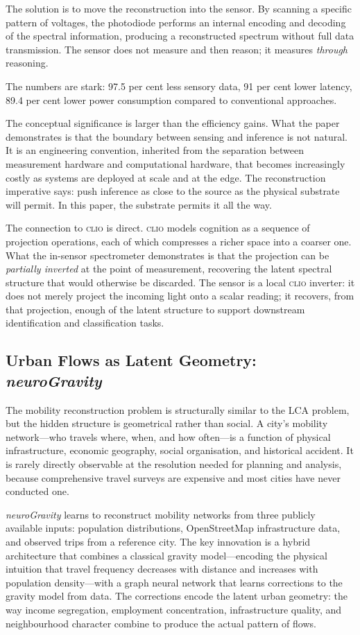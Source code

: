 \documentclass[12pt, letterpaper]{article}
\theoremstyle{remark}
\newcommand{\clio}{\textsc{clio}}
\newcommand{\neuro}{\textit{neuroGravity}}
\begin{document}
The solution is to move the reconstruction into the sensor.  By scanning
a specific pattern of voltages, the photodiode performs an internal
encoding and decoding of the spectral information, producing a reconstructed
spectrum without full data transmission.  The sensor does not measure and
then reason; it measures \emph{through} reasoning.

The numbers are stark: 97.5 per cent less sensory data, 91 per cent lower
latency, 89.4 per cent lower power consumption compared to conventional
approaches.

The conceptual significance is larger than the efficiency gains.  What the
paper demonstrates is that the boundary between sensing and inference is
not natural.  It is an engineering convention, inherited from the separation
between measurement hardware and computational hardware, that becomes
increasingly costly as systems are deployed at scale and at the edge.
The reconstruction imperative says: push inference as close to the source
as the physical substrate will permit.  In this paper, the substrate permits
it all the way.

The connection to \clio{} is direct.  \clio{} models cognition as a sequence
of projection operations, each of which compresses a richer space into a
coarser one.  What the in-sensor spectrometer demonstrates is that the
projection can be \emph{partially inverted} at the point of measurement,
recovering the latent spectral structure that would otherwise be discarded.
The sensor is a local \clio{} inverter: it does not merely project the
incoming light onto a scalar reading; it recovers, from that projection,
enough of the latent structure to support downstream identification and
classification tasks.

\subsection{Urban Flows as Latent Geometry: \neuro{}}

The mobility reconstruction problem is structurally similar to the LCA
problem, but the hidden structure is geometrical rather than social.  A
city's mobility network---who travels where, when, and how often---is a
function of physical infrastructure, economic geography, social organisation,
and historical accident.  It is rarely directly observable at the resolution
needed for planning and analysis, because comprehensive travel surveys are
expensive and most cities have never conducted one.

\neuro{} learns to reconstruct mobility networks from three publicly
available inputs: population distributions, OpenStreetMap infrastructure
data, and observed trips from a reference city.  The key innovation is a
hybrid architecture that combines a classical gravity model---encoding the
physical intuition that travel frequency decreases with distance and
increases with population density---with a graph neural network that learns
corrections to the gravity model from data.  The corrections encode the
latent urban geometry: the way income segregation, employment concentration,
infrastructure quality, and neighbourhood character combine to produce the
actual pattern of flows.
\end{document}
